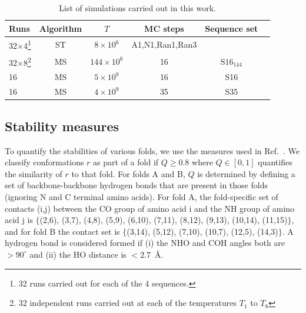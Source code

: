 \documentclass[%
 aip,
rsi,%
 amsmath,amssymb,
 reprint,%
]{revtex4-1}
\begin{document}
\begin{table}
\caption{\label{tab:table1} List of simulations carried out in this work. }
\begin{ruledtabular}
\begin{tabular}{lccccr}
Runs & Algorithm & $T$ & MC steps &  Sequence set\\
\hline
32$\times$4\footnote{32 runs carried out for each of the 4 sequences. } & ST & $8\times 10^6$ &A1,N1,Ran1,Ran3\\
32$\times$8\footnote{32 independent runs carried out at each of the temperatures $T_1$ to $T_8$} & MS & $144\times 10^6$ & 16 &$\mathrm{S16}_{144}$\\
16 & MS & $5\times 10^9$ & 16 & S16 \\
16 & MS & $4\times 10^9$ & 35 & S35 \\
\end{tabular}
\end{ruledtabular}
\end{table}

\subsection{Stability measures}
\noindent
To quantify the stabilities of various folds, we use the measures used in Ref.~\cite{Holzgrafe2015}. We classify conformations $r$ as part of a fold if $Q\ge0.8$ where $Q\in [0,1]$ quantifies the similarity of $r$ to that fold. For folds A and B, $Q$ is determined by defining a set of backbone-backbone hydrogen bonds that are present in those folds (ignoring N and C terminal amino acids). For fold A, the fold-specific set of contacts (i,j) between the CO group of amino acid i and the NH group of amino acid j is $\{$(2,6), (3,7), (4,8), (5,9), (6,10), (7,11), (8,12), (9,13), (10,14), (11,15)$\}$, and for fold B the contact set is $\{$(3,14), (5,12), (7,10), (10,7), (12,5), (14,3)$\}$. A hydrogen bond is considered formed if (i) the NHO and COH angles both are $>90^\circ$ and (ii) the HO distance is $<2.7$~{\AA}. 

%
\end{document}
